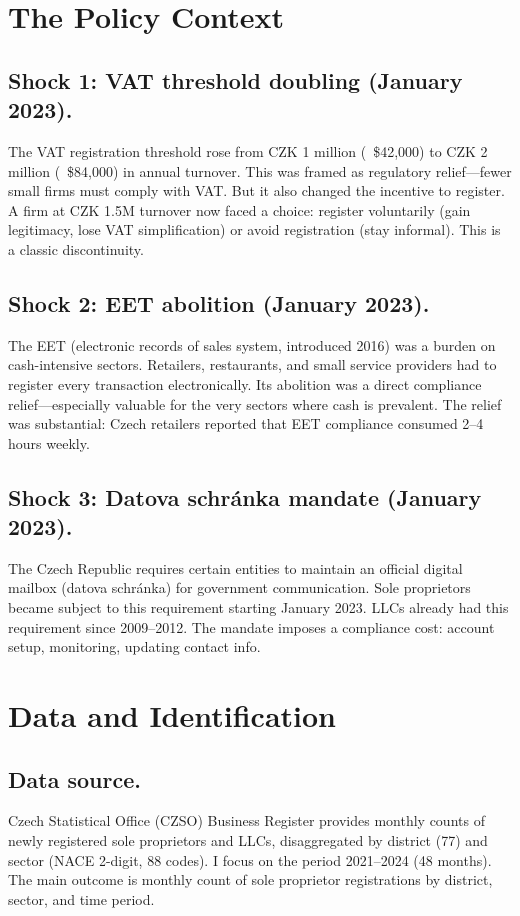 \documentclass[12pt]{article}
\begin{document}
\section{The Policy Context}

\subsection*{Shock 1: VAT threshold doubling (January 2023).}
The VAT registration threshold rose from CZK 1 million (~\$42,000) to CZK 2 million (~\$84,000) in annual turnover. This was framed as regulatory relief---fewer small firms must comply with VAT. But it also changed the incentive to register. A firm at CZK 1.5M turnover now faced a choice: register voluntarily (gain legitimacy, lose VAT simplification) or avoid registration (stay informal). This is a classic discontinuity.

\subsection*{Shock 2: EET abolition (January 2023).}
The EET (electronic records of sales system, introduced 2016) was a burden on cash-intensive sectors. Retailers, restaurants, and small service providers had to register every transaction electronically. Its abolition was a direct compliance relief---especially valuable for the very sectors where cash is prevalent. The relief was substantial: Czech retailers reported that EET compliance consumed 2--4 hours weekly.

\subsection*{Shock 3: Datova schr\'{a}nka mandate (January 2023).}
The Czech Republic requires certain entities to maintain an official digital mailbox (datova schr\'{a}nka) for government communication. Sole proprietors became subject to this requirement starting January 2023. LLCs already had this requirement since 2009--2012. The mandate imposes a compliance cost: account setup, monitoring, updating contact info.

\section{Data and Identification}

\subsection*{Data source.}
Czech Statistical Office (CZSO) Business Register provides monthly counts of newly registered sole proprietors and LLCs, disaggregated by district (77) and sector (NACE 2-digit, 88 codes). I focus on the period 2021--2024 (48 months). The main outcome is monthly count of sole proprietor registrations by district, sector, and time period.
\end{document}

